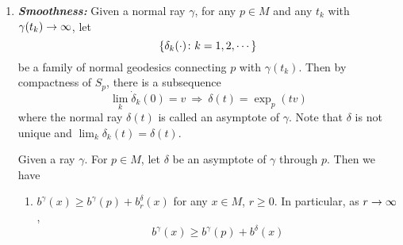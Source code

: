\begin{enumerate}[label=\arabic{*}.]
\begin{equation*}
	\end{equation*}
	is well-defined. Consider the level set of $b^\gamma_t$,
	\begin{equation*}
		\bb{x \in M \colon b^\gamma_t(x) = c} ~\Leftrightarrow~ \bb{x \in M \colon d(x,\gamma(t)) = t-c}
	\end{equation*}
	So $b^\gamma(x)$ ``measure'' the difference of $d(O,\gamma(\infty))$ and $d(x,\gamma(\infty))$, which is basically the ``(signed)distance'' between $O$ and the projection of $x$ onto $\gamma$.
	\begin{prop}
		We have $b^\gamma(\gamma(t)) = t$. If $M$ contains a line $\gamma$, then let $\gamma^+ = \gamma|_{[0,\infty)}$ we have
		\begin{equation*}
			b^{\gamma^+}(\gamma(t)) = t,\quad \forall~t \in (-\infty,\infty)
		\end{equation*}
	\end{prop}
	\begin{proof}
		By definition,
		\begin{equation*}
			b^{\gamma^+}(\gamma(t)) = \lim_{s \sto \infty} s - d(\gamma(t), \gamma^+(s)) = \lim_{s \sto \infty} s - \abs{t-s} = t \qedhere
		\end{equation*}
	\end{proof}

	\item \emph{\textbf{Smoothness:}} Given a normal ray $\gamma$, for any $p \in M$ and any $t_k$ with $\gamma(t_k) \rightarrow \infty$, let
	\begin{equation*}
		\left\{\delta_k(\cdot) \colon k=1,2,\cdots\right\}
	\end{equation*}
	be a family of normal geodesics connecting $p$ with $\gamma(t_k)$. Then by compactness of $S_p$, there is a subsequence
	\begin{equation*}
		\lim_k\dot{\delta}_k(0) = v~\Rightarrow~\delta(t) = \exp_p(tv)
	\end{equation*}
	where the normal ray $\delta(t)$ is called an asymptote of $\gamma$. Note that $\delta$ is not unique and $\lim_k \delta_k(t) = \delta(t)$. 

	\begin{prop}
		Given a ray $\gamma$. For $p \in M$, let $\delta$ be an asymptote of $\gamma$ through $p$. Then we have
		\begin{enumerate}[label=(\arabic{*})]
			\item $b^\gamma(x) \geq b^\gamma(p) + b^\delta_r(x)$ for any $x\in M$, $r \geq 0$. In particular, as $r \rightarrow \infty$,
			\begin{equation*}
				b^\gamma(x) \geq b^\gamma(p) + b^\delta(x)
			\end{equation*}


\end{enumerate}
\end{prop}
\end{enumerate}
